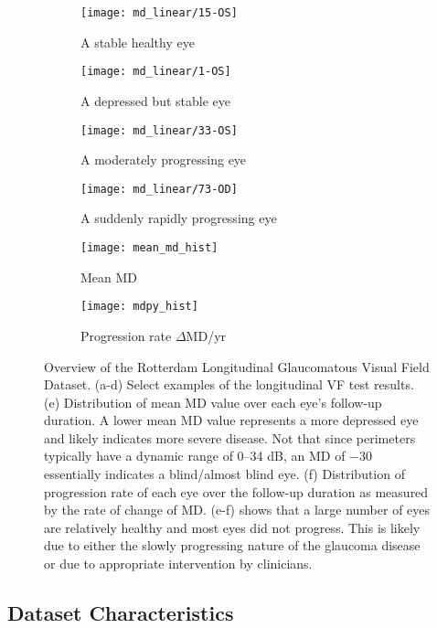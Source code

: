 \begin{figure}[p]
	\centering
	\begin{subfigure}[b]{0.49\textwidth}
		\centering
		\texttt{[image: md\_linear/15-OS]}
		\caption{A stable healthy eye}
	\end{subfigure}
	\hfill
	\begin{subfigure}[b]{0.49\textwidth}
		\centering
		\texttt{[image: md\_linear/1-OS]}
		\caption{A depressed but stable eye}
	\end{subfigure}
	\hfill
	\begin{subfigure}[b]{0.49\textwidth}
		\centering
		\texttt{[image: md\_linear/33-OS]}
		\caption{A moderately progressing eye}
	\end{subfigure}
	\hfill
	\begin{subfigure}[b]{0.49\textwidth}
		\centering
		\texttt{[image: md\_linear/73-OD]}
		\caption{A suddenly rapidly progressing eye}
	\end{subfigure}
	\hfill
	\begin{subfigure}[b]{0.49\textwidth}
		\centering
		\texttt{[image: mean\_md\_hist]}
		\caption{Mean MD}
		\label{fig:mean_md_hist}
	\end{subfigure}
	\hfill
	\begin{subfigure}[b]{0.49\textwidth}
		\centering
		\texttt{[image: mdpy\_hist]}
		\caption{Progression rate $\Delta$MD/yr}
		\label{fig:mdpy_hist}
	\end{subfigure}
	\caption[Overview of the Rotterdam Longitudinal Glaucomatous Visual Field Dataset]{Overview of the Rotterdam Longitudinal Glaucomatous Visual Field Dataset. (a-d) Select examples of the longitudinal \acl{VF} test results. (e) Distribution of mean MD value over each eye's follow-up duration. A lower mean MD value represents a more depressed eye and likely indicates more severe disease. Not that since perimeters typically have a dynamic range of $0$--$34$ dB, an MD of $-30$ essentially indicates a blind/almost blind eye. (f) Distribution of progression rate of each eye over the follow-up duration as measured by the rate of change of MD. (e-f) shows that a large number of eyes are relatively healthy and most eyes did not progress. This is likely due to either the slowly progressing nature of the glaucoma disease or due to appropriate intervention by clinicians.}
\end{figure}

\subsection{Dataset Characteristics}

